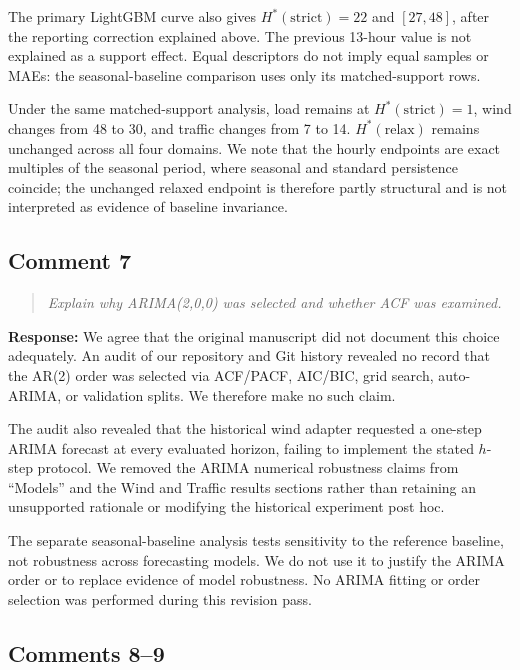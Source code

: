 \documentclass[11pt,a4paper]{article}
\newenvironment{reviewcomment}
  {\begin{quote}\itshape}
  {\end{quote}}
\newcommand{\response}{\noindent\textbf{Response:} }
\begin{document}
The primary LightGBM curve also gives $H^*(\mathrm{strict})=22$ and
$[27,48]$, after the reporting correction explained above. The previous
13-hour value is not explained as a support effect. Equal descriptors
do not imply equal samples or MAEs: the seasonal-baseline comparison
uses only its matched-support rows.

Under the same matched-support analysis, load remains at
$H^*(\mathrm{strict})=1$, wind changes from 48 to 30, and traffic changes from
7 to 14. $H^*(\mathrm{relax})$ remains unchanged across all four domains. We
note that the hourly endpoints are exact multiples of the seasonal period,
where seasonal and standard persistence coincide; the unchanged relaxed
endpoint is therefore partly structural and is not interpreted as evidence of
baseline invariance.


\subsection*{Comment 7}

\begin{reviewcomment}
Explain why ARIMA(2,0,0) was selected and whether ACF was examined.
\end{reviewcomment}

\response
We agree that the original manuscript did not document this choice adequately.
An audit of our repository and Git history revealed no record that the AR(2)
order was selected via ACF/PACF, AIC/BIC, grid search, auto-ARIMA, or validation
splits. We therefore make no such claim.

The audit also revealed that the historical wind adapter requested a one-step
ARIMA forecast at every evaluated horizon, failing to implement the stated
$h$-step protocol. We removed the ARIMA numerical robustness claims from
``Models'' and the Wind and Traffic results sections rather than retaining an
unsupported rationale or modifying the historical experiment post hoc.

The separate seasonal-baseline analysis tests sensitivity to the reference
baseline, not robustness across forecasting models. We do not use it to
justify the ARIMA order or to replace evidence of model robustness. No
ARIMA fitting or order selection was performed during this revision pass.


\subsection*{Comments 8--9}
\end{document}

